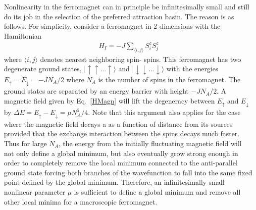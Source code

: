 \documentclass[showpacs,preprintnumbers,amsmath,amssymb,12pt]{revtex4-2}
\begin{document}
Nonlinearity in the ferromagnet can in principle be infinitesimally
small and still do its job in the selection of the preferred
attraction basin. The reason is as follows. For simplicity, consider a
ferromagnet in 2 dimensions with the Hamiltonian
\begin{eqnarray}
  H_I = -J \sum\limits_{\langle i,j \rangle} S_i^z S_j^z
\label{IsingHam}
\end{eqnarray}
where $\langle i,j \rangle$ denotes nearest neighboring spin-{\small
  \textonehalf} spins. This ferromagnet has two degenerate ground
states, $|\!  \uparrow \uparrow ... \uparrow \rangle$ and $|\!
\downarrow \downarrow ... \downarrow \rangle$ with the energies
$E_\uparrow = E_\downarrow = -JN_A/2$ where $N_A$ is the number of
spins in the ferromagnet. The ground states are separated by an energy
barrier with height $-JN_A/2$. A magnetic field given by
Eq.~\eqref{HMagn} will lift the degeneracy between $E_\uparrow$ and
$E_\downarrow$ by $\Delta E = E_\uparrow - E_\downarrow = \mu
N_A^2/4$. Note that this argument also applies for the case where the
magnetic field decays a as a function of distance from its sources
provided that the exchange interaction between the spins decays much
faster. Thus for large $N_A$, the energy from the initially
fluctuating magnetic field will not only define a global minimum, but
also eventually grow strong enough in order to completely remove the
local minimum connected to the anti-parallel ground state forcing both
branches of the wavefunction to fall into the same fixed point defined
by the global minimum. Therefore, an infinitesimally small nonlinear
parameter $\mu$ is sufficient to define a global minimum and remove
all other local minima for a macroscopic ferromagnet.
\end{document}
